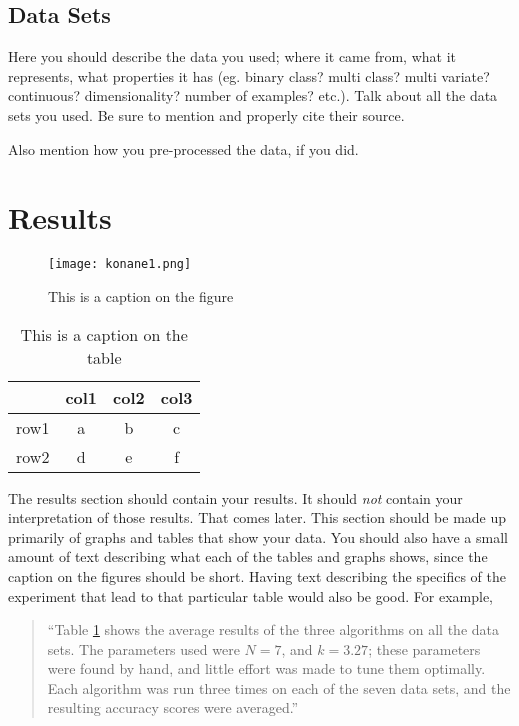 \documentclass[12pt,letterpaper]{article}
\begin{document}
\subsection*{Data Sets}
Here you should describe the data you used; where it came from, what it
represents, what properties it has (eg. binary class? multi class? multi
variate? continuous? dimensionality? number of examples? etc.).  Talk about all
the data sets you used.  Be sure to mention and properly cite their source.

Also mention how you pre-processed the data, if you did.


\section{Results}
\begin{figure}
\begin{center}
\texttt{[image: konane1.png]}
\end{center}
\caption{This is a caption on the figure}
\label{somefigure}
\end{figure}

\begin{table}
\begin{center}
\begin{tabular}{|c||c|cc}
\hline
& col1 & col2 & col3\\
\hline \hline
row1 & a & b & c\\
\hline 
row2 & d & e & f\\
\hline 
\end{tabular}
\end{center}
\caption{This is a caption on the table}
\label{sometable}
\end{table}

The results section should contain your results.  It should \emph{not} contain
your interpretation of those results.  That comes later.  This section should be
made up primarily of graphs and tables that show your data.  You should also
have a small amount of text describing what each of the tables and graphs shows,
since the caption on the figures should be short.  Having text describing the
specifics of the experiment that lead to that particular table would also be
good.  For example,

\begin{quote}
``Table \ref{sometable} shows the average results of the three algorithms on all
the data sets.  The parameters used were $N=7$, and $k=3.27$; these parameters
were found by hand, and little effort was made to tune them optimally.  Each
algorithm was run three times on each of the seven data sets, and the resulting
accuracy scores were averaged.''
\end{quote}
\end{document}
